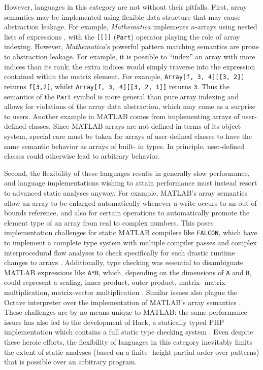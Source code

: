 \documentclass[preprint]{sigplanconf}
\newcommand{\MATLAB}{\textsc{MATLAB}}
\newcommand{\Mathematica}{\textit{Mathematica}}
\newcommand{\code}[1]{\texttt{#1}}
\begin{document}
However, languages in this category are not without their pitfalls. First,
array semantics may be implemented using flexible data structure that may
cause abstraction leakage. For example, \Mathematica{} implements $n$-arrays
using nested lists of expressions \cite{mathematica:nl, mathematica:int}, with
the \code{[[]]} (\code{Part}) operator playing the role of array indexing.
However, \Mathematica's powerful pattern matching semantics are prone to
abstraction leakage. For example, it is possible to ``index'' an array with
more indices than its rank; the extra indices would simply traverse into the
expression contained within the matrix element. For example, \code{Array[f,
{3, 4}][[3, 2]]} returns \code{f[3,2]}, whilst \code{Array[f, {3, 4}][[3, 2,
1]]} returns \code{3}. Thus the semantics of the \code{Part} symbol is more
general than pure array indexing and allows for violations of the array data
abstraction, which may come as a surprise to users. Another example in
\MATLAB{} comes from implementing arrays of user-defined classes. Since
\MATLAB{} arrays are not defined in terms of its object system, special care
must be taken for arrays of user-defined classes to have the same semantic
behavior as arrays of built- in types. In principle, user-defined classes
could otherwise lead to arbitrary behavior.


Second, the flexibility of these languages results in generally slow
performance, and language implementations wishing to attain performance must
instead resort to advanced static analyses anyway. For example, \MATLAB's
array semantics allow an array to be enlarged automatically whenever a write
occurs to an out-of-bounds reference, and also for certain operations to
automatically promote the element type of an array from real to complex
numbers. This poses implementation challenges for static \MATLAB{} compilers
like \code{FALCON}, which have to implement a complete type system with
multiple compiler passes and complex interprocedural flow analyses to check
specifically for such drastic runtime changes to arrays \cite{Rose:1999tt,
Li:2013mf}. Additionally, type checking was essential to disambiguate
\MATLAB{} expressions like \code{A*B}, which, depending on the dimensions of
\code{A} and \code{B}, could represent a scaling, inner product, outer
product, matrix- matrix multiplication, matrix-vector multiplication
\cite{Rose:1999tt}. Similar issues also plague the Octave interpreter over the
implementation of \MATLAB's array semantics \cite{Eaton:2001op}. These
challenges are by no means unique to \MATLAB: the same performance issues has
also led to the development of Hack, a statically typed PHP implementation
which contains a full static type checking system \cite{Verlaguet:2014hn}.
Even despite these heroic efforts, the flexibility of languages in this
category inevitably limits the extent of static analyses (based on a finite-
height partial order over patterns) that is possible over an arbitrary
program.
\end{document}
